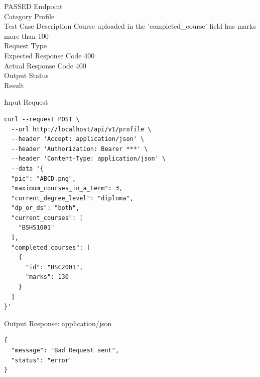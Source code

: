 \begin{testcase}{16}{PASSED}
Endpoint \hfill {}\\
Category \hfill Profile\\
Test Case Description \hfill Course uploaded in the 'completed\_course' field has marks more than 100\\

Request Type    \hfill {}\\
Expected Response Code    \hfill 400\\
Actual Response Code    \hfill 400\\

Output Status \hfill {}\\
Result \hfill {}

\begin{ipblock}{Input Request}
\begin{verbatim}
curl --request POST \
  --url http://localhost/api/v1/profile \
  --header 'Accept: application/json' \
  --header 'Authorization: Bearer ***' \
  --header 'Content-Type: application/json' \
  --data '{
  "pic": "ABCD.png",
  "maximum_courses_in_a_term": 3,
  "current_degree_level": "diploma",
  "dp_or_ds": "both",
  "current_courses": [
    "BSHS1001"
  ],
  "completed_courses": [
    {
      "id": "BSC2001",
      "marks": 130
    }
  ]
}'
\end{verbatim}
\end{ipblock}

\begin{opblock}{Output Response: application/json}
\begin{verbatim}
{
  "message": "Bad Request sent",
  "status": "error"
}
\end{verbatim}
\end{opblock}
\end{testcase}

